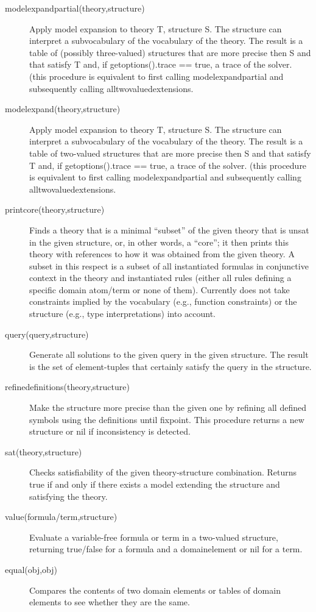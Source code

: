 \begin{description}
	\item[modelexpandpartial(theory,structure)]
		Apply model expansion to theory T, structure S. The structure can interpret a subvocabulary of the vocabulary of the theory.
 		The result is a table of (possibly three-valued) structures that are more precise then S and that satisfy T  and, if getoptions().trace == true, a trace of the solver.
		(this procedure is equivalent to first calling modelexpandpartial and subsequently calling alltwovaluedextensions. 
	\item[modelexpand(theory,structure)]
 		Apply model expansion to theory T, structure S. The structure can interpret a subvocabulary of the vocabulary of the theory.
 		The result is a table of two-valued structures that are more precise then S and that satisfy T and, if getoptions().trace == true, a trace of the solver.
		(this procedure is equivalent to first calling modelexpandpartial and subsequently calling alltwovaluedextensions. 
	\item[printcore(theory,structure)]
		Finds a theory that is a minimal ``subset'' of the given theory that is unsat in the given structure, or, in other words, a ``core''; it then prints this theory with 
		references to how it was obtained from the given theory.
		A subset in this respect is a subset of all instantiated formulas in conjunctive context in the theory and instantiated rules 
		(either all rules defining a specific domain atom/term or none of them).
		Currently does not take constraints implied by the vocabulary (e.g., function constraints) or the structure (e.g., type interpretations) into account.
	\item[query(query,structure)]
 		Generate all solutions to the given query in the given structure. The result is the set of element-tuples that certainly satisfy the query in the structure.
	\item[refinedefinitions(theory,structure)]
		Make the structure more precise than the given one by refining all defined symbols using the definitions until fixpoint. This procedure returns a new structure or nil if inconsistency is detected.
	\item[sat(theory,structure)]
		Checks satisfiability of the given theory-structure combination. Returns true if and only if there exists a model extending the structure and satisfying the theory.
	\item[value(formula/term,structure)]
		Evaluate a variable-free formula or term in a two-valued structure, returning true/false for a formula and a domainelement or nil for a term.
	\item[equal(obj,obj)]
		Compares the contents of two domain elements or tables of domain elements to see whether they are the same.		
\end{description}

